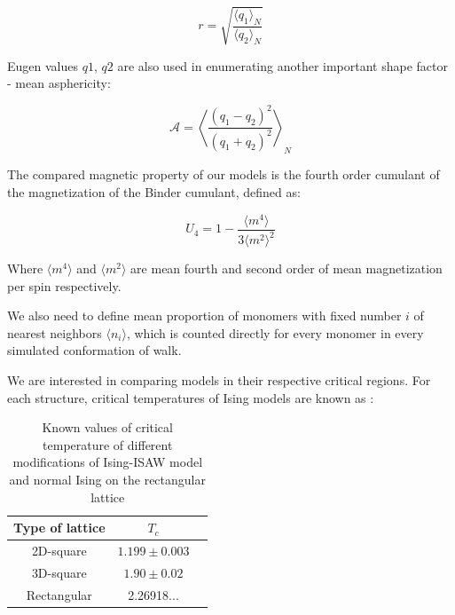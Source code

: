 \documentclass[aps,pre,amssymb,amsmath,twocolumn,floatfix]{revtex4-2}
\begin{document}
\begin{equation}
    r = \sqrt{\frac{\langle q_{1}\rangle_{N}}{\langle q_{2} \rangle_{N}}}
\end{equation}

Eugen values $q1$, $q2$ are also used in enumerating another important shape factor - mean asphericity\cite{Caracciolo_2011}:

\begin{equation}
\label{eq:Asphericity}
    \mathcal{A} = \left\langle \frac{(q_{1} - q_{2})^{2}}{(q_{1} + q_{2})^{2}} \right\rangle_{N}
\end{equation}


The compared magnetic property of our models is the fourth order cumulant of the magnetization of the Binder cumulant, defined as\cite{Selke2006}:

\begin{equation}
\label{eq:Cumulant}
U_{4} = 1 - \frac{\langle m^{4} \rangle}{3 \langle m^{2} \rangle^{2}}
\end{equation}

Where $\langle m^{4} \rangle$ and $\langle m^{2} \rangle$ are mean fourth and second order of mean magnetization per spin respectively.

We also need to define mean proportion of monomers with fixed number $i$ of nearest neighbors $\langle n_{i} \rangle$, which is counted directly for every monomer in every simulated conformation of walk.

We are interested in comparing models in their respective critical regions. For each structure, critical temperatures of Ising models are known as \cite{Foster2021,Selke2006}:

\begin{table}[h]
    \centering
    \begin{tabular}{|c|c|c|}
        \hline
        Type of lattice & $T_{c}$ \\ \hline
        2D-square & $1.199 \pm 0.003$\cite{Foster2021} \\ \hline
        3D-square & $1.90 \pm 0.02$\cite{Foster2021}\\ \hline
        Rectangular & 2.26918...\cite{Selke2006}\\ \hline
    \end{tabular}
    \caption{Known values of critical temperature of different modifications of Ising-ISAW model and normal Ising on the rectangular lattice}
    \label{tab:Ising_T_c}
\end{table}
\end{document}
